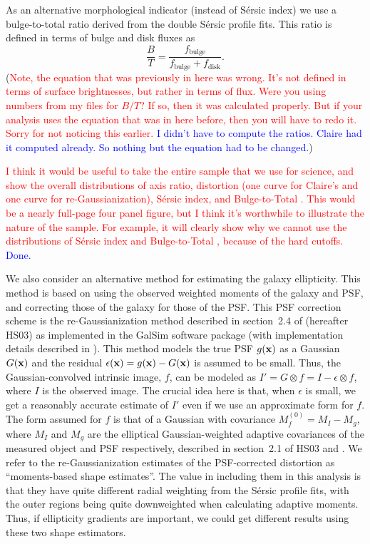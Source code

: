 \documentclass[twocolumn,useAMS,usenatbib]{mn2e}
\newcommand{\rachel}[1]{{\textcolor{red}{#1}}}
\newcommand{\arun}[1]{{\textcolor{blue}{#1}}}
\newcommand{\sersic}{S\'{e}rsic }
\newcommand{\btt}{Bulge-to-Total }
\begin{document}
As an alternative morphological indicator (instead of \sersic index)
we use a bulge-to-total ratio derived from the double \sersic
profile fits.  This ratio is defined in terms of bulge and disk fluxes as
\begin{equation}
\frac{B}{T} = \frac{f_\text{bulge}}{f_\text{bulge}+f_\text{disk}}.
\end{equation}
(\rachel{Note, the equation that was previously in here was wrong.
  It's not defined in terms of surface brightnesses, but rather in
  terms of flux.  Were you using numbers from my files for $B/T$?  If
  so, then it was calculated properly.  But if your analysis uses the
  equation that was in here before, then you will have to redo it.
  Sorry for not noticing this earlier.}
 \arun{I didn't have to compute the ratios. Claire had it computed already. So nothing but the equation had to be changed.})

 
\rachel{I think it would be useful to take the entire sample that we
  use for science, and show the overall distributions of axis ratio,
  distortion (one curve for Claire's and one curve for
  re-Gaussianization), \sersic index, and \btt.  This would be a
  nearly full-page four panel figure, but I think it's worthwhile to
  illustrate the nature of the sample.  For example, it will clearly
  show why we cannot use the distributions of \sersic index and \btt,
  because of the hard cutoffs.} \arun{Done.}

We also consider an alternative method for estimating the galaxy
ellipticity.  This method is based on using the observed weighted
moments of the galaxy and PSF, and correcting those of the galaxy for
those of the PSF.  This PSF correction scheme is the
re-Gaussianization method described in section~2.4 of \cite{HS03}
(hereafter HS03) as implemented in the {\sc GalSim} software package
(with implementation details described in \citealt{2014arXiv1407.7676R}).
This method models the true PSF $g({\bf x})$ as a Gaussian $G({\bf x})$ and the residual $\epsilon({\bf x}) = g({\bf x}) - G({\bf x})$ is assumed to be small. Thus, the Gaussian-convolved
intrinsic image, $f$, can be modeled as $I' = G\otimes f = I - \epsilon \otimes f$, where $I$ is the observed image. The crucial idea here is that, when $\epsilon$ is small, we get a reasonably accurate
estimate of $I'$ even if we use an approximate form for $f$. The form
assumed for $f$ is that of a Gaussian with covariance $M_f^{(0)} = M_I
- M_g$, where $M_I$ and $M_g$ are the elliptical Gaussian-weighted adaptive
covariances of the measured object and PSF respectively, described in
section~2.1 of HS03 and \cite{BJ02}. We refer to the
re-Gaussianization estimates of the PSF-corrected distortion as
``moments-based shape estimates''.  The value in including them in
this analysis is that they have quite different radial weighting from
the \sersic profile fits, with the outer regions being quite
downweighted when calculating adaptive moments.  Thus, if ellipticity
gradients are important, we could get different results using these
two shape estimators.
\end{document}
